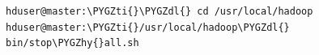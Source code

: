 \documentclass[letterpaper,10pt,english]{sphinxmanual}
\def\PYGZdl{\char`\$}
\def\PYGZhy{\char`\-}
\def\PYGZti{\char`\~}
\begin{document}
\begin{Verbatim}[commandchars=\\\{\}]
hduser@master:\PYGZti{}\PYGZdl{} cd /usr/local/hadoop
hduser@master:\PYGZti{}/usr/local/hadoop\PYGZdl{} bin/stop\PYGZhy{}all.sh
\end{Verbatim}
\begin{figure}[htbp]
\centering

\end{figure}
\end{document}
